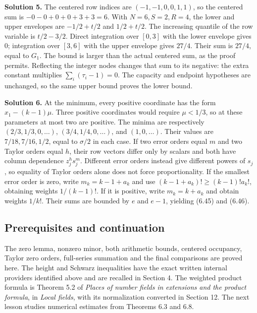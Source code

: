 \documentclass[
  11pt,
  a4paper,
]{article}
\begin{document}
\textbf{Solution 5.} The centered row indices are \((-1,-1,0,0,1,1)\),
so the centered sum is \(-0-0+0+0+3+3=6\). With \(N=6,S=2,R=4\), the
lower and upper envelopes are \(-1/2+t/2\) and \(1/2+t/2\). The
increasing quantile of the row variable is \(t/2-3/2\). Direct
integration over \([0,3]\) with the lower envelope gives \(0\);
integration over \([3,6]\) with the upper envelope gives \(27/4\). Their
sum is \(27/4\), equal to \(G_1\). The bound is larger than the actual
centered sum, as the proof permits. Reflecting the integer nodes changes
that sum to its negative: the extra constant multiplies
\(\sum_i(\tau_i-1)=0\). The capacity and endpoint hypotheses are
unchanged, so the same upper bound proves the lower bound.

\textbf{Solution 6.} At the minimum, every positive coordinate has the
form \(x_1-(k-1)\mu\). Three positive coordinates would require
\(\mu<1/3\), so at these parameters at most two are positive. The minima
are respectively \((2/3,1/3,0,\ldots)\), \((3/4,1/4,0,\ldots)\), and
\((1,0,\ldots)\). Their values are \(7/18,7/16,1/2\), equal to
\(\sigma/2\) in each case. If two error orders equal \(m\) and two
Taylor orders equal \(h\), their row vectors differ only by scalars and
both have column dependence \(z_j^h s_j^m\). Different error orders
instead give different powers of \(s_j\), so equality of Taylor orders
alone does not force proportionality. If the smallest error order is
zero, write \(m_k=k-1+a_k\) and use \((k-1+a_k)!\ge(k-1)!a_k!\),
obtaining weights \(1/(k-1)!\). If it is positive, write \(m_k=k+a_k\)
and obtain weights \(1/k!\). Their sums are bounded by \(e\) and
\(e-1\), yielding (6.45) and (6.46).

\subsection{Prerequisites and
continuation}\label{prerequisites-and-continuation}

The zero lemma, nonzero minor, both arithmetic bounds, centered
occupancy, Taylor zero orders, full-series summation and the final
comparisons are proved here. The height and Schwarz inequalities have
the exact written internal providers identified above and are recalled
in Section 4. The weighted product formula is Theorem 5.2 of
\emph{Places of number fields in extensions and the product formula}, in
\emph{Local fields}, with its normalization converted in Section 12. The
next lesson studies numerical estimates from Theorems 6.3 and 6.8.
\end{document}
